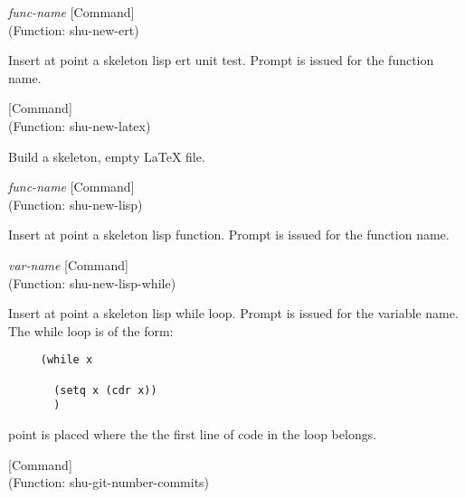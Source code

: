 \vspace{1em}
\noindent
{}
\usebox{\funcname}\emph{func-name}
 \hfill [Command]\\%
 (Function: shu-new-ert)

\begin{doc-string}
Insert at point a skeleton lisp ert unit test.  Prompt is issued for the
function name.
\end{doc-string}

\vspace{1em}
\noindent
{}
\usebox{\funcname}
 \hfill [Command]\\%
 (Function: shu-new-latex)

\begin{doc-string}
Build a skeleton, empty LaTeX file.
\end{doc-string}

\vspace{1em}
\noindent
{}
\usebox{\funcname}\emph{func-name}
 \hfill [Command]\\%
 (Function: shu-new-lisp)

\begin{doc-string}
Insert at point a skeleton lisp function.  Prompt is issued for the function
name.
\end{doc-string}

\vspace{1em}
\noindent
{}
\usebox{\funcname}\emph{var-name}
 \hfill [Command]\\%
 (Function: shu-new-lisp-while)

\begin{doc-string}
Insert at point a skeleton lisp while loop.  Prompt is issued for the
variable name.  The while loop is of the form:

\small{\begin{verbatim}
     (while x

       (setq x (cdr x))
       )
\end{verbatim}}
point is placed where the the first line of code in the loop belongs.
\end{doc-string}

\vspace{1em}
\noindent
{}
\usebox{\funcname}
 \hfill [Command]\\%
 (Function: shu-git-number-commits)

